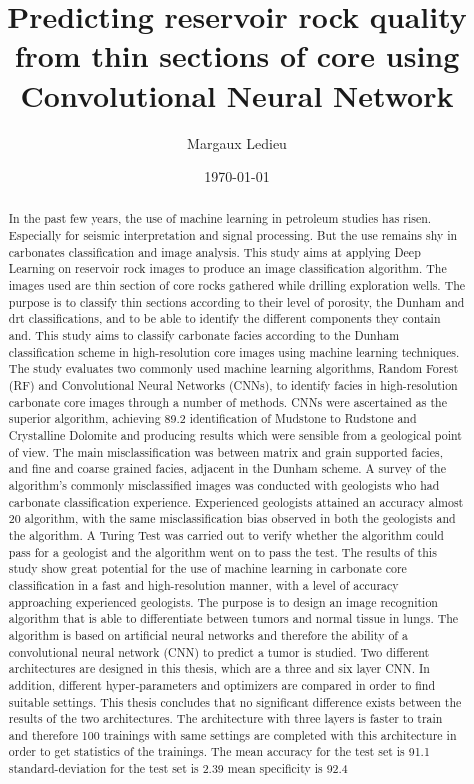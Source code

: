 \documentclass{kththesis}
\title{Predicting reservoir rock quality from thin sections of core using Convolutional Neural Network}
\author{Margaux Ledieu}
\date{\today}
\begin{document}
\frontmatter

\titlepage

\begin{abstract}
In the past few years, the use of machine learning in petroleum studies has risen. Especially for seismic interpretation and signal processing. But the use remains shy in carbonates classification and image analysis. This study aims at applying Deep Learning on reservoir rock images to produce an image classification algorithm. The images used are thin section of core rocks gathered while drilling exploration wells. The purpose is to classify thin sections according to their level of porosity, the Dunham and \gls{drt} classifications, and to be able to identify the different components they contain and. 
This study aims to classify carbonate facies according to the Dunham
classification scheme in high-resolution core images using machine learning techniques. The study
evaluates two commonly used machine learning algorithms, Random Forest (RF) and Convolutional
Neural Networks (CNNs), to identify facies in high-resolution carbonate core images through a number
of methods. CNNs were ascertained as the superior algorithm, achieving 89.2%
identification of Mudstone to Rudstone and Crystalline Dolomite and producing results which were
sensible from a geological point of view. The main misclassification was between matrix and grain
supported facies, and fine and coarse grained facies, adjacent in the Dunham scheme. A survey of
the algorithm’s commonly misclassified images was conducted with geologists who had carbonate
classification experience. Experienced geologists attained an accuracy almost 20%
algorithm, with the same misclassification bias observed in both the geologists and the algorithm. A
Turing Test was carried out to verify whether the algorithm could pass for a geologist and the algorithm
went on to pass the test. The results of this study show great potential for the use of machine
learning in carbonate core classification in a fast and high-resolution manner, with a level of accuracy
approaching experienced geologists.
 The purpose is
to design an image recognition algorithm that is able to differentiate between tumors
and normal tissue in lungs. The algorithm is based on artificial neural networks and
therefore the ability of a convolutional neural network (CNN) to predict a tumor is
studied. Two different architectures are designed in this thesis, which are a three and
six layer CNN. In addition, different hyper-parameters and optimizers are compared in
order to find suitable settings.
This thesis concludes that no significant difference exists between the results of the
two architectures. The architecture with three layers is faster to train and therefore
100 trainings with same settings are completed with this architecture in order
to get statistics of the trainings. The mean accuracy for the test set is 91.1%
standard-deviation for the test set is 2.39%
mean specificity is 92.4%
\end{abstract}
\end{document}
